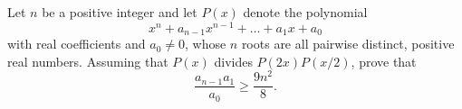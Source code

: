 Let $n$ be a positive integer and let $P(x)$ denote the polynomial
$$x^n + a_{n-1}x^{n-1} + \dots + a_1 x + a_0$$
with real coefficients and $a_0 \neq 0$, whose $n$ roots are all pairwise distinct, positive real numbers.
Assuming that $P(x)$ divides $P(2x)P(x/2)$, prove that
$$\frac{a_{n-1} a_1}{a_0} \ge \frac{9n^2}8.$$
